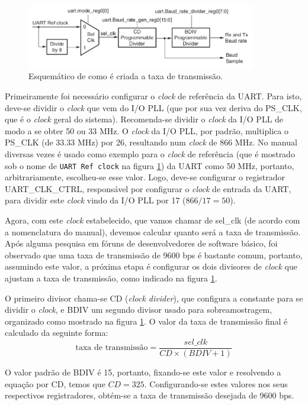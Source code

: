 \begin{figure}[ht!]
    \centering
    \includegraphics[width=10cm]{figuras/uart_board_rate}
    \caption{Esquemático de como é criada a taxa de transmissão.}
	\label{fig:uart}
\end{figure}

Primeiramente foi necessário configurar o \emph{clock} de referência da UART. Para isto, deve-se dividir o \emph{clock} que vem do I/O PLL (que por sua vez deriva do PS\_CLK, que é o \emph{clock} geral do sistema). Recomenda-se dividir o \emph{clock} da I/O PLL de modo a se obter 50 ou 33 MHz.
O \emph{clock} da I/O PLL, por padrão, multiplica o PS\_CLK (de 33.33 MHz) por 26, resultando num \emph{clock} de 866 MHz.
No manual diversas vezes é usado como exemplo para o \emph{clock} de referência (que é mostrado sob o nome de \verb+UART Ref clock+ na figura \ref{fig:uart}) da UART como 50 MHz, portanto, arbitrariamente, escolheu-se esse valor. Logo, deve-se configurar o registrador UART\_CLK\_CTRL, responsável por configurar o \emph{clock} de entrada da UART, para dividir este \emph{clock} vindo da I/O PLL por 17 ($866/17 = 50$).

Agora, com este \emph{clock} estabelecido, que vamos chamar de sel\_clk (de acordo com a nomenclatura do manual), devemos calcular quanto será a taxa de transmissão.
Após alguma pesquisa em fóruns de desenvolvedores de software básico, foi observado que uma taxa de transmissão de 9600 bps é bastante comum, portanto, assumindo este valor, a próxima etapa é configurar os dois divisores de \emph{clock} que ajustam a taxa de transmissão, como indicado na figura \ref{fig:uart}.

O primeiro divisor chama-se CD (\emph{clock divider}), que configura a constante para se dividir o \emph{clock}, e BDIV um segundo divisor usado para sobreamostragem, organizado como mostrado na figura \ref{fig:uart}. O valor da taxa de transmissão final é calculado da seguinte forma:
\begin{equation}
	\text{taxa de transmissão} = \frac{sel\_clk}{CD \times (BDIV+1)}
\end{equation}

O valor padrão de BDIV é 15, portanto, fixando-se este valor e resolvendo a equação por CD, temos que $CD = 325$. Configurando-se estes valores nos seus respectivos registradores, obtém-se a taxa de transmissão desejada de 9600 bps.

